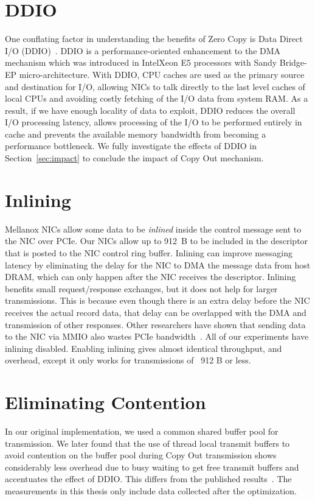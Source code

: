 \section{DDIO}
One conflating factor in understanding the benefits of Zero Copy is Data Direct I/O (DDIO)~\cite{ddio}.
 DDIO is a performance-oriented enhancement to the DMA mechanism which was introduced in Intel\textregistered Xeon E5 processors with Sandy Bridge-EP micro-architecture.
 With DDIO, CPU caches are used as the primary source and destination for I/O, 
allowing NICs to talk directly to the last level caches of local CPUs
and avoiding costly fetching of the I/O data from system RAM. As a result, if we have enough locality of data to exploit,
DDIO reduces the overall I/O processing latency, allows processing of the I/O 
to be performed entirely in cache and prevents the available memory bandwidth from becoming a performance bottleneck.
We fully investigate the effects of DDIO in Section~\ref{sec:impact} to conclude the impact of 
Copy Out mechanism.


\section{Inlining}
Mellanox NICs allow some data to be {\em inlined} inside the control message
sent to the NIC over PCIe. Our NICs allow up to 912~B to be included in the
descriptor that is posted to the NIC control ring buffer.  Inlining can improve
messaging latency by eliminating the delay for the NIC to DMA the message data
from host DRAM, which can only happen after the NIC receives the descriptor.
Inlining benefits small request/response exchanges, but it does not help for
larger transmissions. This is because even though there is an extra delay
before the NIC receives the actual record data, that delay can be overlapped
with the DMA and transmission of other responses. Other researchers have shown
that sending data to the NIC via MMIO also wastes PCIe bandwidth~\cite{rdma}.
All of our experiments have inlining disabled. Enabling inlining gives almost 
identical throughput, and overhead, except it only works for transmissions of ~912 B or less.

\section{Eliminating Contention}
\label{sec:code-optimisation}
In our original implementation, we used a common shared buffer pool for transmission.
We later found that the use of thread local transmit buffers to avoid contention on the buffer pool during 
Copy Out transmission shows considerably less overhead due to busy waiting to get free transmit buffers 
and accentuates the effect of DDIO. This differs from the published results~\cite{imdmpaper}. 
The measurements in this thesis only include data collected after the optimization.

